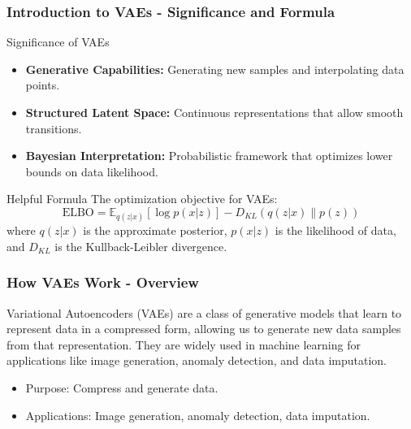 \documentclass[aspectratio=169]{beamer}
\begin{document}
\begin{frame}[fragile]
    \frametitle{Introduction to VAEs - Significance and Formula}
    \begin{block}{Significance of VAEs}
        \begin{itemize}
            \item \textbf{Generative Capabilities:} Generating new samples and interpolating data points.
            \item \textbf{Structured Latent Space:} Continuous representations that allow smooth transitions.
            \item \textbf{Bayesian Interpretation:} Probabilistic framework that optimizes lower bounds on data likelihood.
        \end{itemize}
    \end{block}

    \begin{block}{Helpful Formula}
        The optimization objective for VAEs:
        \begin{equation}
        \text{ELBO} = \mathbb{E}_{q(z|x)}[\log p(x|z)] - D_{KL}(q(z|x) \| p(z))
        \end{equation}
        where $q(z|x)$ is the approximate posterior, $p(x|z)$ is the likelihood of data, and $D_{KL}$ is the Kullback-Leibler divergence.
    \end{block}
\end{frame}

\begin{frame}[fragile]
    \frametitle{How VAEs Work - Overview}
    
    Variational Autoencoders (VAEs) are a class of generative models that learn to represent data in a compressed form, allowing us to generate new data samples from that representation. They are widely used in machine learning for applications like image generation, anomaly detection, and data imputation.

    \begin{itemize}
        \item Purpose: Compress and generate data.
        \item Applications: Image generation, anomaly detection, data imputation.
    \end{itemize}

\end{frame}
\end{document}
